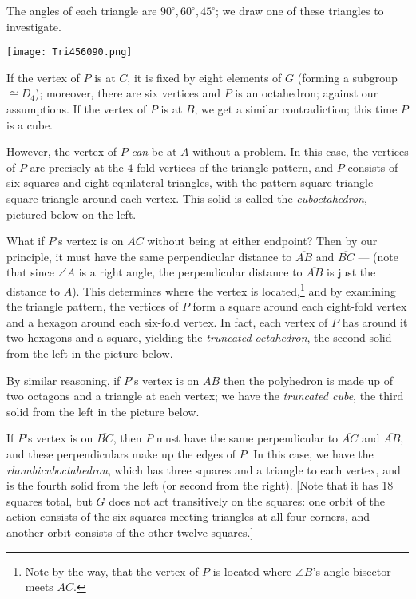 \documentclass[leqno]{book}
\begin{document}
The angles of each triangle are $90^\circ,60^\circ,45^\circ$; we draw one of these triangles to investigate.
\begin{center}
\texttt{[image: Tri456090.png]}
\end{center}
If the vertex of $P$ is at $C$, it is fixed by eight elements of $G$ (forming a subgroup $\cong D_4$); moreover, there are six vertices and $P$ is an octahedron; against our assumptions.  If the vertex of $P$ is at $B$, we get a similar contradiction; this time $P$ is a cube.

However, the vertex of $P$ \emph{can} be at $A$ without a problem.  In this case, the vertices of $P$ are precisely at the $4$-fold vertices of the triangle pattern, and $P$ consists of six squares and eight equilateral triangles, with the pattern square-triangle-square-triangle around each vertex.  This solid is called the \emph{cuboctahedron}, pictured below on the left.

What if $P$'s vertex is on $\overline{AC}$ without being at either endpoint?  Then by our principle, it must have the same perpendicular distance to $\overline{AB}$ and $\overline{BC}$ \---- (note that since $\angle A$ is a right angle, the perpendicular distance to $\overline{AB}$ is just the distance to $A$).  This determines where the vertex is located,\footnote{Note by the way, that the vertex of $P$ is located where $\angle B$'s angle bisector meets $\overline{AC}$.} and by examining the triangle pattern, the vertices of $P$ form a square around each eight-fold vertex and a hexagon around each six-fold vertex.  In fact, each vertex of $P$ has around it two hexagons and a square, yielding the \emph{truncated octahedron}, the second solid from the left in the picture below.

By similar reasoning, if $P$'s vertex is on $\overline{AB}$ then the polyhedron is made up of two octagons and a triangle at each vertex; we have the \emph{truncated cube}, the third solid from the left in the picture below.

If $P$'s vertex is on $\overline{BC}$, then $P$ must have the same perpendicular to $\overline{AC}$ and $\overline{AB}$, and these perpendiculars make up the edges of $P$.  In this case, we have the \emph{rhombicuboctahedron}, which has three squares and a triangle to each vertex, and is the fourth solid from the left (or second from the right).  [Note that it has 18 squares total, but $G$ does not act transitively on the squares: one orbit of the action consists of the six squares meeting triangles at all four corners, and another orbit consists of the other twelve squares.]
\end{document}
